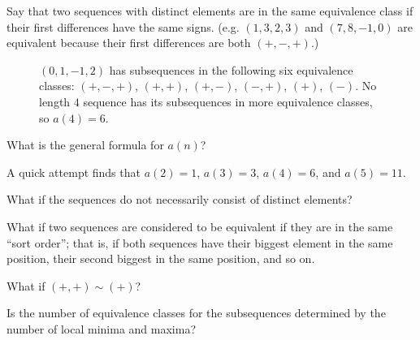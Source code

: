 \documentclass{article}
\begin{document}
  Say that two sequences with distinct elements are in the same equivalence
  class if their first differences have the same signs.
  (e.g. $(1, 3, 2, 3)$ and $(7,8,-1,0)$ are equivalent because their first
  differences are both $(+, -, +)$.)
  \begin{figure}[!h]
    \centering
    \caption{
      $(0, 1, -1, 2)$ has subsequences in the following six equivalence classes:
      $(+, -, +)$, $(+, +)$, $(+, -)$, $(-, +)$, $(+)$, $(-)$. No length $4$
      sequence has its subsequences in more equivalence classes, so $a(4) = 6$.
    }
  \end{figure}

\begin{question}
  What is the general formula for $a(n)$?
\end{question}
\begin{note}
  A quick attempt finds that $a(2) = 1$, $a(3) = 3$, $a(4)=6$, and $a(5)=11$.
\end{note}
\begin{related}
  \item What if the sequences do not necessarily consist of distinct elements?
  \item What if two sequences are considered to be equivalent if they are in the
    same ``sort order''; that is, if both sequences have their biggest element
    in the same position, their second biggest in the same position, and so on.
  \item What if $(+, +) \sim (+)$?
  \item Is the number of equivalence classes for the subsequences determined by
   the number of local minima and maxima?
\end{related}
\end{document}
